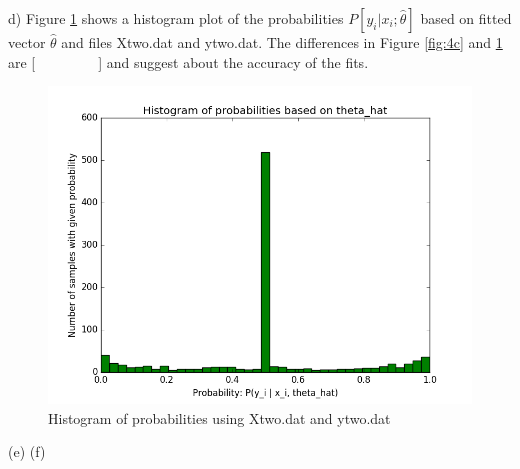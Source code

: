 \documentclass[11pt]{article}
\newenvironment{problem}[2][Problem]{\begin{trivlist}
\item[\hskip \labelsep {\bfseries #1}\hskip \labelsep {\bfseries #2.}]}{\end{trivlist}}
\begin{document}
\begin{problem}{2.4}
(d) Figure \ref{fig:4d} shows a histogram plot of the probabilities $P[y_i | x_i;\hat{\theta}]$  based on fitted vector $\hat{\theta}$ and files Xtwo.dat and ytwo.dat. {\color{red} The differences in Figure \ref{fig:4c} and \ref{fig:4d} are [~~~~~~~~~] and suggest about the accuracy of the fits.}
\begin{figure}[h!]
  \centering
  \includegraphics[scale=0.5]{figs/4d.png}
  \caption{Histogram of probabilities using Xtwo.dat and ytwo.dat}
  \label{fig:4d}
\end{figure}

{\color{red}(e) (f)}

\end{problem}
\end{document}
